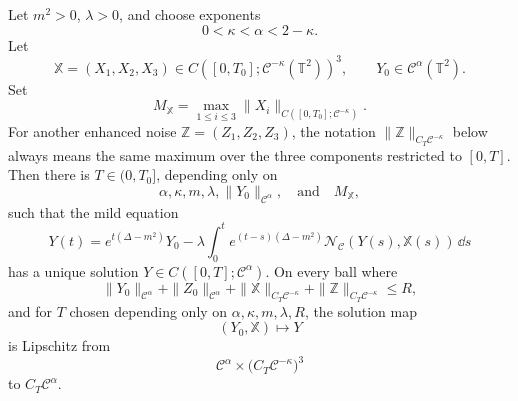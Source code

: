 \begin{theorem}
\label{thm:spde-dpd-besov-local-fixed-point}
Let \(m^2>0\), \(\lambda>0\), and choose exponents
\[
  0<\kappa<\alpha<2-\kappa .
\]
Let
\[
  \mathbb X=(X_1,X_2,X_3)
  \in C([0,T_0];\mathcal C^{-\kappa}(\mathbb T^2))^3 ,
  \qquad
  Y_0\in\mathcal C^\alpha(\mathbb T^2).
\]
Set
\[
  M_{\mathbb X}
  =
  \max_{1\leq i\leq3}\|X_i\|_{C([0,T_0];\mathcal C^{-\kappa})}.
\]
For another enhanced noise
\(\mathbb Z=(Z_1,Z_2,Z_3)\), the notation
\(\|\mathbb Z\|_{C_T\mathcal C^{-\kappa}}\) below always means the same
maximum over the three components restricted to \([0,T]\).
Then there is \(T\in(0,T_0]\), depending only on
\[
  \alpha,\kappa,m,\lambda,\|Y_0\|_{\mathcal C^\alpha},
  \quad\text{and}\quad M_{\mathbb X},
\]
such that the mild equation
\begin{equation}
  Y(t)
  =
  e^{t(\Delta-m^2)}Y_0
  -
  \lambda
  \int_0^t
  e^{(t-s)(\Delta-m^2)}
  \mathcal N_{\mathcal C}(Y(s),\mathbb X(s))\,\dd s
  \label{eq:spde-dpd-besov-mild-equation}
\end{equation}
has a unique solution \(Y\in C([0,T];\mathcal C^\alpha)\).  On every ball
where
\[
  \|Y_0\|_{\mathcal C^\alpha}
  +\|Z_0\|_{\mathcal C^\alpha}
  +\|\mathbb X\|_{C_T\mathcal C^{-\kappa}}
  +\|\mathbb Z\|_{C_T\mathcal C^{-\kappa}}
  \leq R ,
\]
and for \(T\) chosen depending only on
\(\alpha,\kappa,m,\lambda,R\), the solution map
\[
  (Y_0,\mathbb X)\longmapsto Y
\]
is Lipschitz from
\[
  \mathcal C^\alpha\times
  \bigl(C_T\mathcal C^{-\kappa}\bigr)^3
\]
to
\(C_T\mathcal C^\alpha\).
\end{theorem}


